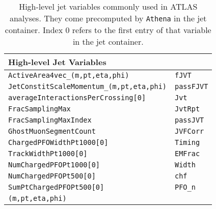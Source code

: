 \begin{table}[!htb]
    \centering
    \small
    \caption{High-level jet variables commonly used in ATLAS analyses. They come precomputed by \texttt{Athena} in the jet container. Index 0 refers to the first entry of that variable in the jet container.}
    \label{tab:high_level_variables}
    \begin{tabular}{ll}
    \toprule
    \normalsize{High-level Jet Variables} &  \\
    \midrule
        \texttt{ActiveArea4vec\_(m,pt,eta,phi)} & \texttt{fJVT}\\
        \texttt{JetConstitScaleMomentum\_(m,pt,eta,phi)} & \texttt{passFJVT}\\
        \texttt{averageInteractionsPerCrossing[0]} & \texttt{Jvt}\\
        \texttt{FracSamplingMax} & \texttt{JvtRpt}\\
        \texttt{FracSamplingMaxIndex} & \texttt{passJVT}\\
        \texttt{GhostMuonSegmentCount} & \texttt{JVFCorr}\\
        \texttt{ChargedPFOWidthPt1000[0]} & \texttt{Timing}\\
        \texttt{TrackWidthPt1000[0]} & \texttt{EMFrac}\\
        \texttt{NumChargedPFOPt1000[0]} & \texttt{Width}\\
        \texttt{NumChargedPFOPt500[0]} & \texttt{chf}\\
        \texttt{SumPtChargedPFOPt500[0]} & \texttt{PFO\_n}\\
        \texttt{(m,pt,eta,phi)} & \\
        \bottomrule
    \end{tabular}
\end{table}
    

